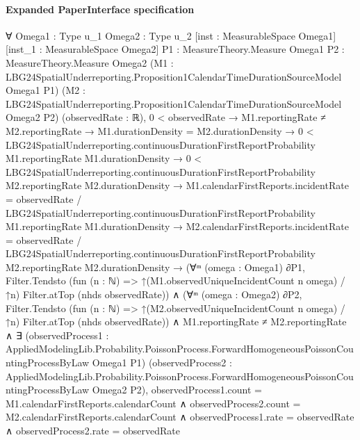 \documentclass[10pt]{article}
\begin{document}
\paragraph{Expanded PaperInterface specification}
\begin{ReviewVerbatim}
∀ {Omega1 : Type u_1} {Omega2 : Type u_2} [inst : MeasurableSpace Omega1] [inst_1 : MeasurableSpace Omega2]
  {P1 : MeasureTheory.Measure Omega1} {P2 : MeasureTheory.Measure Omega2}
  (M1 : LBG24SpatialUnderreporting.Proposition1CalendarTimeDurationSourceModel Omega1 P1)
  (M2 : LBG24SpatialUnderreporting.Proposition1CalendarTimeDurationSourceModel Omega2 P2) (observedRate : ℝ),
  0 < observedRate →
    M1.reportingRate ≠ M2.reportingRate →
      M1.durationDensity = M2.durationDensity →
        0 < LBG24SpatialUnderreporting.continuousDurationFirstReportProbability M1.reportingRate M1.durationDensity →
          0 < LBG24SpatialUnderreporting.continuousDurationFirstReportProbability M2.reportingRate M2.durationDensity →
            M1.calendarFirstReports.incidentRate =
                observedRate /
                  LBG24SpatialUnderreporting.continuousDurationFirstReportProbability M1.reportingRate
                    M1.durationDensity →
              M2.calendarFirstReports.incidentRate =
                  observedRate /
                    LBG24SpatialUnderreporting.continuousDurationFirstReportProbability M2.reportingRate
                      M2.durationDensity →
                (∀ᵐ (omega : Omega1) ∂P1,
                    Filter.Tendsto (fun (n : ℕ) => ↑(M1.observedUniqueIncidentCount n omega) / ↑n) Filter.atTop
                      (nhds observedRate)) ∧
                  (∀ᵐ (omega : Omega2) ∂P2,
                      Filter.Tendsto (fun (n : ℕ) => ↑(M2.observedUniqueIncidentCount n omega) / ↑n) Filter.atTop
                        (nhds observedRate)) ∧
                    M1.reportingRate ≠ M2.reportingRate ∧
                      ∃ (observedProcess1 :
                        AppliedModelingLib.Probability.PoissonProcess.ForwardHomogeneousPoissonCountingProcessByLaw
                          Omega1 P1)
                        (observedProcess2 :
                        AppliedModelingLib.Probability.PoissonProcess.ForwardHomogeneousPoissonCountingProcessByLaw
                          Omega2 P2),
                        observedProcess1.count = M1.calendarFirstReports.calendarCount ∧
                          observedProcess2.count = M2.calendarFirstReports.calendarCount ∧
                            observedProcess1.rate = observedRate ∧ observedProcess2.rate = observedRate
\end{ReviewVerbatim}
\end{document}
